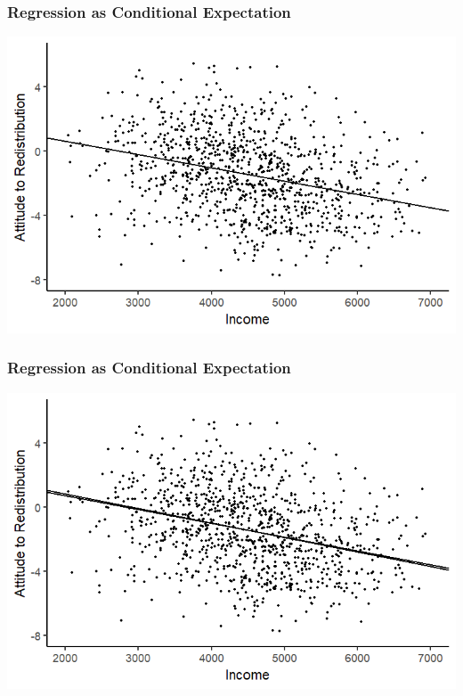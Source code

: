 \documentclass[xcolor=x11names,compress]{beamer}\usepackage[]{graphicx}\usepackage[]{color}
\makeatletter
\def\maxwidth{ %
  \ifdim\Gin@nat@width>\linewidth
    \linewidth
  \else
    \Gin@nat@width
  \fi
}
\newenvironment{knitrout}{}{} %
\renewcommand{\(}{\begin{columns}}
\renewcommand{\)}{\end{columns}}
\newcommand{\<}[1]{\begin{column}{#1}}
\renewcommand{\>}{\end{column}}
\makeatother
\begin{document}
\begin{frame}
\begin{multicols}{2}
\begin{knitrout}
\end{knitrout}
\end{multicols}
\end{frame}

\begin{frame}
\frametitle{Regression as Conditional Expectation}
\begin{knitrout}
\color{fgcolor}
\includegraphics[width=\maxwidth]{figure/cond_exp1d-1} 

\end{knitrout}
\end{frame}

\begin{frame}
\frametitle{Regression as Conditional Expectation}
\begin{knitrout}
\color{fgcolor}
\includegraphics[width=\maxwidth]{figure/cond_exp1e-1} 

\end{knitrout}
\end{frame}
\end{document}
